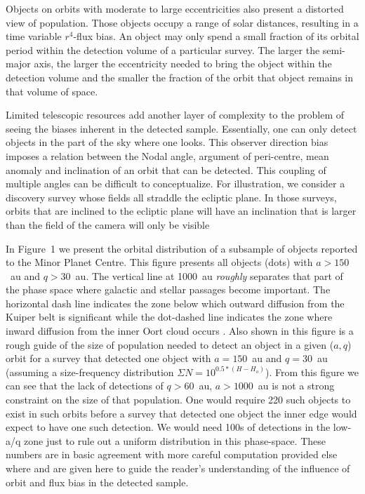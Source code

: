 \documentclass{aastex62}
\begin{document}
Objects on orbits with moderate to large eccentricities also present a distorted view of population.  Those objects occupy a range of solar distances, resulting in a time variable $r^4$-flux bias. An object may only spend a small fraction of its orbital period within the detection volume of a particular survey. The larger the semi-major axis, the larger the eccentricity needed to bring the object within the detection volume and the smaller the fraction of the orbit that object remains in that volume of space.

Limited telescopic resources add another layer of complexity to the problem of seeing the biases inherent in the detected sample.  Essentially, one can only detect objects in the part of the sky where one looks.  This observer direction bias imposes a relation between the Nodal angle, argument of peri-centre, mean anomaly and inclination of an orbit that can be detected.  This coupling of multiple angles can be difficult to conceptualize.  For illustration, we consider a discovery survey whose fields all straddle the ecliptic plane.  In those surveys,  orbits that are inclined to the ecliptic plane will have an inclination that is larger than the field of the camera will only be visible 

In Figure~1 we present the orbital distribution of a subsample of objects reported to the Minor Planet Centre. This figure presents all objects (dots) with $a > 150$~au and $q > 30$~au.  The vertical line at 1000~au {\em roughly} separates that part of the phase space where galactic and stellar passages become important. The horizontal dash line indicates the zone below which outward diffusion from the Kuiper belt is significant while the dot-dashed line indicates the zone where inward diffusion from the inner Oort cloud occurs \citep[see][for details]{bannister17}.  Also shown in this figure is a rough guide of the size of population needed to detect an object in a given ($a,q$) orbit for a survey that detected one object with $a = 150$~au and $q = 30$~au (assuming a size-frequency distribution  $ \Sigma{N} = 10^{0.5*(H-H_o)}$).  From this figure we can see that the lack of detections of $q>60$~au, $a > 1000$~au is not a strong constraint on the size of that population. One would require 220 such objects to exist in such orbits before a survey that detected one object the inner edge would expect to have one such detection.  We would need 100s of detections in the low-a/q zone just to rule out a uniform distribution in this phase-space.  These numbers are in basic agreement with more careful computation provided else where and are given here to guide the reader's understanding of the influence of orbit and flux bias in the detected sample.
\end{document}
